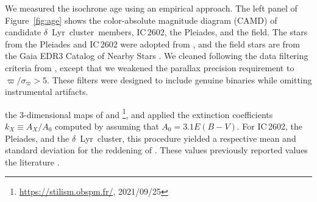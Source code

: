 \documentclass[12pt,modern,twocolumn,tighten,linenumbers]{aastex63}
\newcommand{\cn}{$\delta$\ Lyr\ cluster} %
\begin{document}
We measured the isochrone age using an empirical approach.  The left
panel of Figure~\ref{fig:age} shows the color-absolute magnitude
diagram (CAMD) of candidate \cn\ members, IC\,2602, the Pleiades, and
the field. The stars from the Pleiades and IC\,2602 were adopted from
\citet{CantatGaudin2018a}, and the field stars are from the Gaia EDR3
Catalog of Nearby Stars \citep{gaia_gcns_2021}.  
We cleaned 
following the data filtering criteria from \citet[][Appendix
B]{GaiaCollaboration2018}, except that we weakened the parallax
precision requirement to $\varpi/\sigma_\varpi>5$.   These filters were
designed to include genuine binaries while omitting instrumental
artifacts.  

 the
3-dimensional maps of \citet{capitanio_threedimensional_2017} and
\citet{lallement_threedimensional_2018}\footnote{\url{https://stilism.obspm.fr/},
2021/09/25}, and applied the extinction coefficients $k_X\equiv
A_X/A_0$ computed by \citet{GaiaCollaboration2018} assuming that $A_0
= 3.1 E(B-V)$.  For IC\,2602, the Pleiades, and the \cn, this
procedure yielded a respective mean and standard deviation for the
reddening of .
These values  previously reported values
 the literature \citep{pecaut_star_2016,GaiaCollaboration2018,KounkelCovey2019,bossini_age_2019}.

%
%
%
\end{document}
